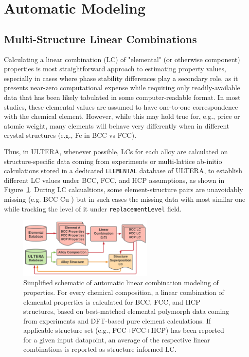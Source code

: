 \section{Automatic Modeling} \label{ultera:sec:automodel}

\subsection{Multi-Structure Linear Combinations} \label{ultera:ssec:autolc}



Calculating a linear combination (LC) of "elemental" (or otherwise component) properties is most straightforward approach to estimating property values, especially in cases where phase stability differences play a secondary role, as it presents near-zero computational expense while requiring only readily-available data that has been likely tabulated in some computer-readable format. In most studies, these elemental values are assumed to have one-to-one correspondence with the chemical element. However, while this may hold true for, e.g., price or atomic weight, many elements will behave very differently when in different crystal structures (e.g., Fe in BCC vs FCC).

Thus, in ULTERA, whenever possible, LCs for each alloy are calculated on structure-specific data coming from experiments or multi-lattice ab-initio calculations \cite{Chong2021CorrelationAlloys} stored in a dedicated \texttt{ELEMENTAL} database of ULTERA, to establish different LC values under BCC, FCC, and HCP assumptions, as shown in Figure~\ref{ultera:fig:autolc}. During LC calcualtions, some element-structure pairs are unavoidably missing (e.g. BCC Cu \cite{Chong2021CorrelationAlloys}) but in such cases the missing data with most similar one while tracking the level of it under \texttt{replacementLevel} field. 

\begin{figure}[H]
    \centering
    \includegraphics[width=0.6\textwidth]{ultera/ULTERA_ElementalDatabase_LC_V1.png}
    \caption{Simplified schematic of automatic linear combination modeling of properties. For every chemical composition, a linear combination of elemental properties is calculated for BCC, FCC, and HCP structures, based on best-matched elemental polymorph data coming from experiments and DFT-based pure element calculations. If applicable structure set (e.g., FCC+FCC+HCP) has been reported for a given input datapoint, an average of the respective linear combinations is reported as structure-informed LC.}
    \label{ultera:fig:autolc}
\end{figure}

